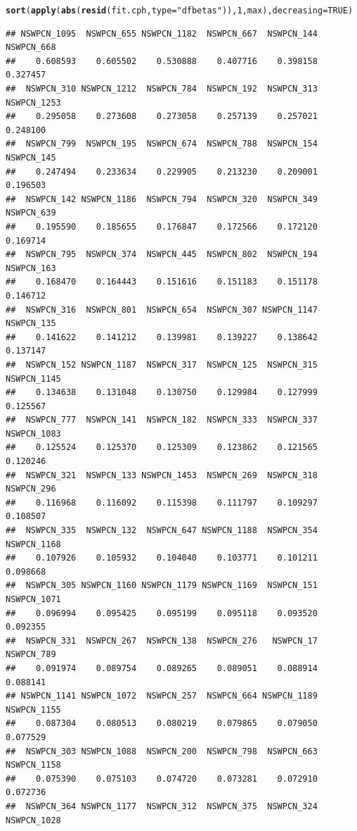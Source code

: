\documentclass{article}\usepackage[]{graphicx}\usepackage[]{color}
\makeatletter
\newcommand{\hlnum}[1]{\textcolor[rgb]{0.686,0.059,0.569}{#1}}%
\newcommand{\hlstr}[1]{\textcolor[rgb]{0.192,0.494,0.8}{#1}}%
\newcommand{\hlstd}[1]{\textcolor[rgb]{0.345,0.345,0.345}{#1}}%
\newcommand{\hlkwc}[1]{\textcolor[rgb]{0.333,0.667,0.333}{#1}}%
\newcommand{\hlkwd}[1]{\textcolor[rgb]{0.737,0.353,0.396}{\textbf{#1}}}%
\newenvironment{kframe}{%
 \def\at@end@of@kframe{}%
 \ifinner\ifhmode%
  \def\at@end@of@kframe{\end{minipage}}%
  \begin{minipage}{\columnwidth}%
 \fi\fi%
 \def\FrameCommand##1{\hskip\@totalleftmargin \hskip-\fboxsep
 \colorbox{shadecolor}{##1}\hskip-\fboxsep
     \hskip-\linewidth \hskip-\@totalleftmargin \hskip\columnwidth}%
 \MakeFramed {\advance\hsize-\width
   \@totalleftmargin\z@ \linewidth\hsize
   \@setminipage}}%
 {\par\unskip\endMakeFramed%
 \at@end@of@kframe}
\newenvironment{knitrout}{}{} %
\makeatother
\begin{document}
\begin{knitrout}
\begin{kframe}\begin{alltt}
\hlkwd{sort}\hlstd{(}\hlkwd{apply}\hlstd{(}\hlkwd{abs}\hlstd{(}\hlkwd{resid}\hlstd{(fit.cph,} \hlkwc{type} \hlstd{=} \hlstr{"dfbetas"}\hlstd{)),} \hlnum{1}\hlstd{, max),} \hlkwc{decreasing} \hlstd{=} \hlnum{TRUE}\hlstd{)}
\end{alltt}
\begin{verbatim}
## NSWPCN_1095  NSWPCN_655 NSWPCN_1182  NSWPCN_667  NSWPCN_144  NSWPCN_668 
##    0.608593    0.605502    0.530888    0.407716    0.398158    0.327457 
##  NSWPCN_310 NSWPCN_1212  NSWPCN_784  NSWPCN_192  NSWPCN_313 NSWPCN_1253 
##    0.295058    0.273608    0.273058    0.257139    0.257021    0.248100 
##  NSWPCN_799  NSWPCN_195  NSWPCN_674  NSWPCN_788  NSWPCN_154  NSWPCN_145 
##    0.247494    0.233634    0.229905    0.213230    0.209001    0.196503 
##  NSWPCN_142 NSWPCN_1186  NSWPCN_794  NSWPCN_320  NSWPCN_349  NSWPCN_639 
##    0.195590    0.185655    0.176847    0.172566    0.172120    0.169714 
##  NSWPCN_795  NSWPCN_374  NSWPCN_445  NSWPCN_802  NSWPCN_194  NSWPCN_163 
##    0.168470    0.164443    0.151616    0.151183    0.151178    0.146712 
##  NSWPCN_316  NSWPCN_801  NSWPCN_654  NSWPCN_307 NSWPCN_1147  NSWPCN_135 
##    0.141622    0.141212    0.139981    0.139227    0.138642    0.137147 
##  NSWPCN_152 NSWPCN_1187  NSWPCN_317  NSWPCN_125  NSWPCN_315 NSWPCN_1145 
##    0.134638    0.131048    0.130750    0.129984    0.127999    0.125567 
##  NSWPCN_777  NSWPCN_141  NSWPCN_182  NSWPCN_333  NSWPCN_337 NSWPCN_1083 
##    0.125524    0.125370    0.125309    0.123862    0.121565    0.120246 
##  NSWPCN_321  NSWPCN_133 NSWPCN_1453  NSWPCN_269  NSWPCN_318  NSWPCN_296 
##    0.116968    0.116092    0.115398    0.111797    0.109297    0.108507 
##  NSWPCN_335  NSWPCN_132  NSWPCN_647 NSWPCN_1188  NSWPCN_354 NSWPCN_1168 
##    0.107926    0.105932    0.104040    0.103771    0.101211    0.098668 
##  NSWPCN_305 NSWPCN_1160 NSWPCN_1179 NSWPCN_1169  NSWPCN_151 NSWPCN_1071 
##    0.096994    0.095425    0.095199    0.095118    0.093520    0.092355 
##  NSWPCN_331  NSWPCN_267  NSWPCN_138  NSWPCN_276   NSWPCN_17  NSWPCN_789 
##    0.091974    0.089754    0.089265    0.089051    0.088914    0.088141 
## NSWPCN_1141 NSWPCN_1072  NSWPCN_257  NSWPCN_664 NSWPCN_1189 NSWPCN_1155 
##    0.087304    0.080513    0.080219    0.079865    0.079050    0.077529 
##  NSWPCN_303 NSWPCN_1088  NSWPCN_200  NSWPCN_798  NSWPCN_663 NSWPCN_1158 
##    0.075390    0.075103    0.074720    0.073281    0.072910    0.072736 
##  NSWPCN_364 NSWPCN_1177  NSWPCN_312  NSWPCN_375  NSWPCN_324 NSWPCN_1028 

\end{verbatim}
\end{kframe}
\end{knitrout}
\end{document}
